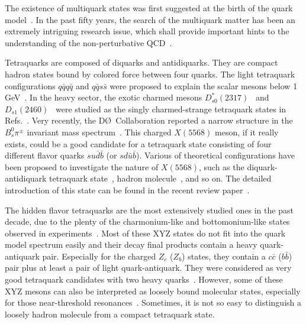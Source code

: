 \documentclass[prd,showpacs,showkeys,floatfix,amsmath,amssymb,floatfix,english]{revtex4}
\begin{document}
The existence of multiquark states was first suggested at the birth
of the quark model~\cite{1964-Gell-Mann-p214-215,1964-Zweig-p-}. In
the past fifty years, the search of the multiquark matter has been
an extremely intriguing research issue, which shall provide
important hints to the understanding of the non-perturbative
QCD~\cite{2016-Chen-p1-121,
2006-Swanson-p243-305,2008-Voloshin-p455-511,2016-Chen-p406-421,2016-Esposito-p1-97,
2017-Lebed-p143-194,2017-Guo-p-}.

Tetraquarks are composed of diquarks and antidiquarks. They are
compact hadron states bound by colored force between four quarks.
The light tetraquark configurations $q\bar q q \bar q$ and $q\bar q
s\bar s$ were proposed to explain the scalar mesons below 1
GeV~\cite{1977-Jaffe-p281-281,2007-Chen-p94025-94025,
1999-Black-p74026-74026,2004-Maiani-p212002-212002}. In the heavy
sector, the exotic charmed mesons
$D_{s0}^\ast(2317)$~\cite{2003-Aubert-p242001-242001}  and
$D_{s1}(2460)$~\cite{2003-Besson-p32002-32002} were studied as the
singly charmed-strange tetraquark states in
Refs.~\cite{2003-Cheng-p193-200,2004-Dmitrasinovic-p96011-96011,2005-Maiani-p14028-14028}.
Very recently, the D\O~Collaboration reported a narrow structure in
the $B_s^0\pi^\pm$ invariant mass
spectrum~\cite{2016-Abazov-p22003-22003}. This charged $X(5568)$
meson, if it really exists, could be a good candidate for a
tetraquark state consisting of four different flavor quarks
$su\bar{d}\bar{b}$ (or $sd\bar{u}\bar{b}$). Various of theoretical
configurations have been proposed to investigate the nature of
$X(5568)$, such as the diquark-antidiquark tetraquark
state~\cite{2016-Chen-p22002-22002,2016-Agaev-p74024-74024,2016-Wang-p335-339,2016-Burns-p627-633,
2016-Guo-p593-595}, hadron
molecule~\cite{2016-Agaev-p351-351,2016-Kang-p54010-54010}, and so
on. The detailed introduction of this state can be found in the
recent review paper~\cite{2017-Chen-p76201-76201}.

The hidden flavor tetraquarks are the most extensively studied ones
in the past decade, due to the plenty of the charmonium-like and
bottomonium-like states observed in
experiments~\cite{2016-Chen-p1-121,
2016-Esposito-p1-97,2017-Lebed-p143-194,2017-Guo-p-,2017-Ali-p-}.
Most of these XYZ states do not fit into the quark model spectrum
easily and their decay final products contain a heavy
quark-antiquark pair. Especially for the charged $Z_c$ ($Z_b$)
states, they contain a $c\bar c$ ($b\bar b$) pair plus at least a
pair of light quark-antiquark. They were considered as very good
tetraquark candidates with two heavy quarks~\cite{2016-Chen-p1-121}.
However, some of these XYZ mesons can also be interpreted as loosely
bound molecular states, especially for those near-threshold
resonances~\cite{2016-Chen-p1-121,2017-Guo-p-}. Sometimes, it is not
so easy to distinguish a loosely hadron molecule from a
compact tetraquark state.
\end{document}
